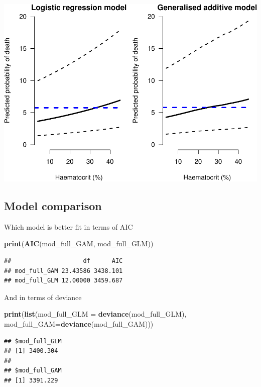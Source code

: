 \documentclass[]{article}
\newenvironment{Shaded}{\begin{snugshade}}{\end{snugshade}}
\newcommand{\KeywordTok}[1]{\textcolor[rgb]{0.13,0.29,0.53}{\textbf{#1}}}
\newcommand{\DataTypeTok}[1]{\textcolor[rgb]{0.13,0.29,0.53}{#1}}
\newcommand{\NormalTok}[1]{#1}
\begin{document}
\includegraphics{LegacyAnalysis_files/figure-latex/counterfactualPlots-1.pdf}

\subsection{Model comparison}\label{model-comparison}

Which model is better fit in terms of AIC

\begin{Shaded}
\begin{Highlighting}[]
\KeywordTok{print}\NormalTok{(}\KeywordTok{AIC}\NormalTok{(mod_full_GAM, mod_full_GLM))}
\end{Highlighting}
\end{Shaded}

\begin{verbatim}
##                    df      AIC
## mod_full_GAM 23.43586 3438.101
## mod_full_GLM 12.00000 3459.687
\end{verbatim}

And in terms of deviance

\begin{Shaded}
\begin{Highlighting}[]
\KeywordTok{print}\NormalTok{(}\KeywordTok{list}\NormalTok{(}\DataTypeTok{mod_full_GLM =} \KeywordTok{deviance}\NormalTok{(mod_full_GLM), }\DataTypeTok{mod_full_GAM=}\KeywordTok{deviance}\NormalTok{(mod_full_GAM)))}
\end{Highlighting}
\end{Shaded}

\begin{verbatim}
## $mod_full_GLM
## [1] 3400.304
## 
## $mod_full_GAM
## [1] 3391.229
\end{verbatim}
\end{document}
